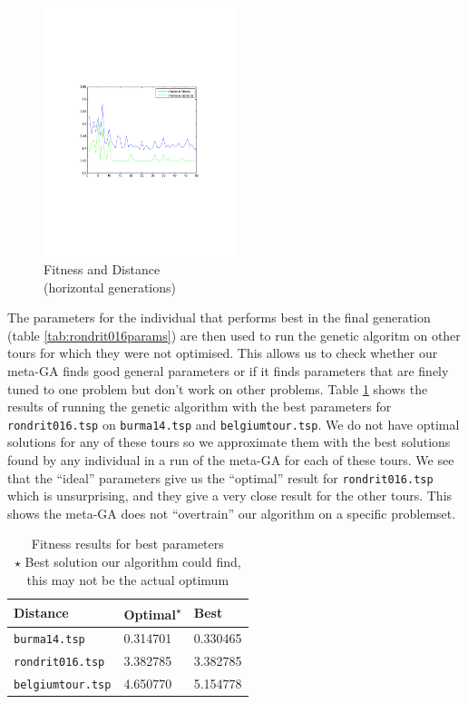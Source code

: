 \documentclass[a4paper]{article}
\begin{document}
\begin{figure}[h]
	\centering
    \includegraphics[width=0.5\textwidth,trim={4cm 8cm 4cm 8cm},clip]{apfitness}
    \captionsetup{justification=centering}
    \caption{Fitness and Distance\\
    		(horizontal generations)}
    \label{fig:apfitdist}
\end{figure}

The parameters for the individual that performs best in the final
generation (table \ref{tab:rondrit016params}) are then used to run the
genetic algoritm on other tours for which they were not optimised.
This allows us to check whether our meta-GA finds good general
parameters or if it finds parameters that are finely tuned to one
problem but don't work on other problems.
Table \ref{tab:rondrit016fitness} shows the results of running the
genetic algorithm with the best parameters for \texttt{rondrit016.tsp}
on \texttt{burma14.tsp} and \texttt{belgiumtour.tsp}.
We do not have optimal solutions for any of these tours so we
approximate them with the best solutions found by any individual in a
run of the meta-GA for each of these tours.
We see that the ``ideal'' parameters give us the ``optimal'' result for
\texttt{rondrit016.tsp} which is unsurprising, and they give a very
close result for the other tours.
This shows the meta-GA does not ``overtrain'' our algorithm on a
specific problemset.

\begin{table}[h]
  \centering
  \begin{tabular}{l l l}
  	\hline
  	Distance & Optimal\textsuperscript{$\star$} & Best \\
  	\hline
    \texttt{burma14.tsp}			& 0.314701	& 0.330465 \\
    \texttt{rondrit016.tsp}			& 3.382785	& 3.382785 \\
    \texttt{belgiumtour.tsp}		& 4.650770	& 5.154778 \\
    \hline
  \end{tabular}
  \captionsetup{justification=centering}
  \caption{Fitness results for best parameters \\
  	$\star$ Best solution our algorithm could find, this may not be the actual optimum}
  \label{tab:rondrit016fitness}
\end{table}
\end{document}

